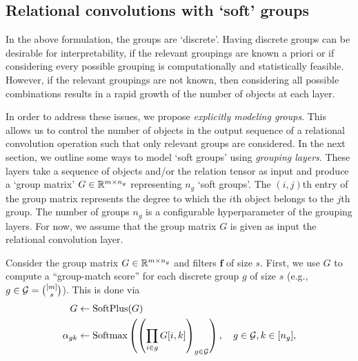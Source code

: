 \subsection{Relational convolutions with `soft' groups}

In the above formulation, the groups are `discrete'. Having discrete groups can be desirable for interpretability, if the relevant groupings are known a priori or if considering every possible grouping is computationally and statistically feasible. However, if the relevant groupings are not known, then considering all possible combinations results in a rapid growth of the number of objects at each layer.

In order to address these issues, we propose \textit{explicitly modeling groups}. This allows us to control the number of objects in the output sequence of a relational convolution operation such that only relevant groups are considered. In the next section, we outline some ways to model `soft groups' using \textit{grouping layers}. These layers take a sequence of objects and/or the relation tensor as input and produce a `group matrix' $G \in \mathbb{R}^{m \times n_g}$ representing $n_g$ `soft groups'. The $(i,j)$th entry of the group matrix represents the degree to which the $i$th object belongs to the $j$th group. The number of groups $n_g$ is a configurable hyperparameter of the grouping layers. For now, we assume that the group matrix $G$ is given as input the relational convolution layer.

Consider the group matrix $G \in \mathbb{R}^{m \times n_g}$ and filters $\bm{f}$ of size $s$. First, we use $G$ to compute a ``group-match score'' for each discrete group $g$ of size $s$ (e.g., $g \in {\mathcal{G}} = \binom{[m]}{s}$). This is done via
\begin{equation}
    \label{eq:group_match_score}
    \begin{split}
        G &\gets \text{SoftPlus}(G)\\
        \alpha_{gk} &\gets \text{Softmax}\left(\left(\prod_{i \in g} G[i,k]\right)_{g \in {\mathcal{G}}}\right), \quad g \in {\mathcal{G}}, k \in [n_g],
    \end{split}
\end{equation}

